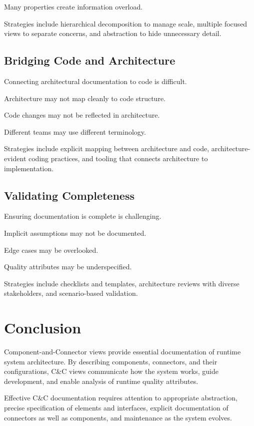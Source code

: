 \documentclass[11pt]{article}
\begin{document}
Many properties create information overload.

Strategies include hierarchical decomposition to manage scale, multiple focused views to separate concerns, and abstraction to hide unnecessary detail.

\subsection{Bridging Code and Architecture}

Connecting architectural documentation to code is difficult.

Architecture may not map cleanly to code structure.

Code changes may not be reflected in architecture.

Different teams may use different terminology.

Strategies include explicit mapping between architecture and code, architecture-evident coding practices, and tooling that connects architecture to implementation.

\subsection{Validating Completeness}

Ensuring documentation is complete is challenging.

Implicit assumptions may not be documented.

Edge cases may be overlooked.

Quality attributes may be underspecified.

Strategies include checklists and templates, architecture reviews with diverse stakeholders, and scenario-based validation.

\section{Conclusion}

Component-and-Connector views provide essential documentation of runtime system architecture. By describing components, connectors, and their configurations, C\&C views communicate how the system works, guide development, and enable analysis of runtime quality attributes.

Effective C\&C documentation requires attention to appropriate abstraction, precise specification of elements and interfaces, explicit documentation of connectors as well as components, and maintenance as the system evolves.
\end{document}
